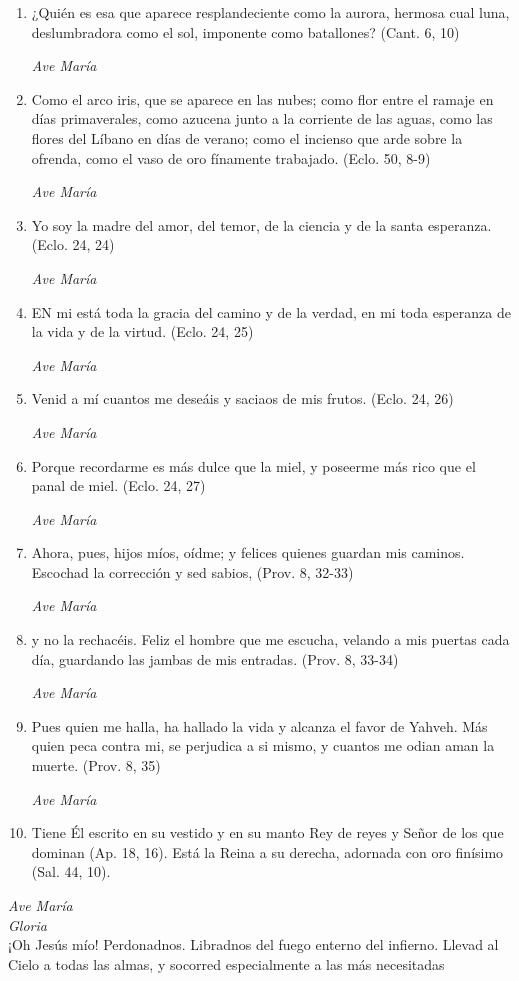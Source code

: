 \documentclass[a4paper,11pt, oneside]{report}
\begin{document}
      \begin{enumerate}

        \item ¿Quién es esa que aparece resplandeciente como la aurora,
        hermosa cual luna, deslumbradora como el sol, imponente como batallones? (Cant. 6, 10)

        \textit{Ave María}

        \item Como el arco iris, que se aparece en las nubes; como flor entre el ramaje en días primaverales, como azucena junto
        a la corriente de las aguas, como las flores del Líbano en días de verano; como el incienso que arde sobre la ofrenda,
        como el vaso de oro fínamente trabajado. (Eclo. 50, 8-9)

        \textit{Ave María}

        \item Yo soy la madre del amor, del temor, de la ciencia y de la santa esperanza. (Eclo. 24, 24)

        \textit{Ave María}

        \item EN mi está toda la gracia del camino y de la verdad, en mi toda esperanza de la vida y de la virtud. (Eclo. 24, 25)

        \textit{Ave María}

        \item Venid a mí cuantos me deseáis y saciaos de mis frutos. (Eclo. 24, 26)

        \textit{Ave María}

        \item Porque recordarme es más dulce que la miel, y poseerme más rico que el panal de miel. (Eclo. 24, 27)

        \textit{Ave María}

        \item Ahora, pues, hijos míos, oídme; y felices quienes guardan mis caminos. Escochad la corrección y sed sabios, (Prov. 8, 32-33)

        \textit{Ave María}

        \item y no la rechacéis. Feliz el hombre que me escucha, velando a mis puertas cada día,
        guardando las jambas de mis entradas. (Prov. 8, 33-34)

        \textit{Ave María}

        \item Pues quien me halla, ha hallado la vida y alcanza el favor de Yahveh. Más quien peca contra mi, se perjudica a si mismo,
        y cuantos me odian aman la muerte. (Prov. 8, 35)

        \textit{Ave María}

        \item Tiene Él escrito en su vestido y en su manto Rey de reyes y Señor de los que dominan (Ap. 18, 16).
        Está la Reina a su derecha, adornada con oro finísimo (Sal. 44, 10).
      \end{enumerate}

      \textit{Ave María} \\
      \indent\textit{Gloria} \\
      \indent¡Oh Jesús mío! Perdonadnos. Libradnos del fuego enterno del infierno. Llevad al Cielo a todas las almas, y socorred especialmente a las más 
      necesitadas
      
\end{document}
